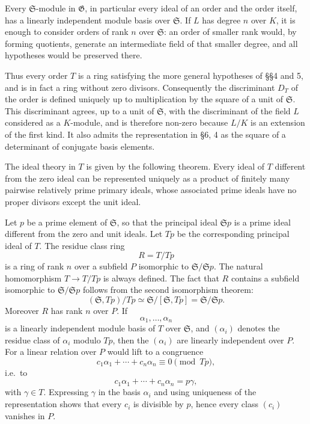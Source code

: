 \documentclass[
  12pt,
]{article}
\begin{document}
Every \(\mathfrak S\)-module in \(\mathfrak G\), in particular every
ideal of an order and the order itself, has a linearly independent
module basis over \(\mathfrak S\). If \(L\) has degree \(n\) over \(K\),
it is enough to consider orders of rank \(n\) over \(\mathfrak S\): an
order of smaller rank would, by forming quotients, generate an
intermediate field of that smaller degree, and all hypotheses would be
preserved there.

Thus every order \(T\) is a ring satisfying the more general hypotheses
of §§4 and 5, and is in fact a ring without zero divisors. Consequently
the discriminant \(D_T\) of the order is defined uniquely up to
multiplication by the square of a unit of \(\mathfrak S\). This
discriminant agrees, up to a unit of \(\mathfrak S\), with the
discriminant of the field \(L\) considered as a \(K\)-module, and is
therefore non-zero because \(L/K\) is an extension of the first kind. It
also admits the representation in §6, 4 as the square of a determinant
of conjugate basis elements.

The ideal theory in \(T\) is given by the following theorem. Every ideal
of \(T\) different from the zero ideal can be represented uniquely as a
product of finitely many pairwise relatively prime primary ideals, whose
associated prime ideals have no proper divisors except the unit ideal.

Let \(p\) be a prime element of \(\mathfrak S\), so that the principal
ideal \(\mathfrak S p\) is a prime ideal different from the zero and
unit ideals. Let \(Tp\) be the corresponding principal ideal of \(T\).
The residue class ring \[
  R=T/Tp
\] is a ring of rank \(n\) over a subfield \(P\) isomorphic to
\(\mathfrak S/\mathfrak S p\). The natural homomorphism \(T\to T/Tp\) is
always defined. The fact that \(R\) contains a subfield isomorphic to
\(\mathfrak S/\mathfrak S p\) follows from the second isomorphism
theorem: \[
  (\mathfrak S,Tp)/Tp\simeq
  \mathfrak S/[\mathfrak S,Tp]
  =\mathfrak S/\mathfrak S p.
\] Moreover \(R\) has rank \(n\) over \(P\). If \[
  \alpha_1,
\ldots,
\alpha_n
\] is a linearly independent module basis of \(T\) over \(\mathfrak S\),
and \((\alpha_i)\) denotes the residue class of \(\alpha_i\) modulo
\(Tp\), then the \((\alpha_i)\) are linearly independent over \(P\). For
a linear relation over \(P\) would lift to a congruence \[
  c_1\alpha_1+
\cdots+c_n\alpha_n\equiv0\pmod{Tp},
\] i.e.~to \[
  c_1\alpha_1+
\cdots+c_n\alpha_n=p\gamma,
\] with \(\gamma\in T\). Expressing \(\gamma\) in the basis \(\alpha_i\)
and using uniqueness of the representation shows that every \(c_i\) is
divisible by \(p\), hence every class \((c_i)\) vanishes in \(P\).
\end{document}
